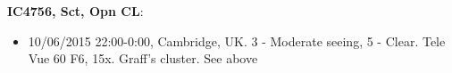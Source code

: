 {\bf IC4756, Sct, Opn CL}:
\begin{itemize}
\item 10/06/2015 22:00-0:00, Cambridge, UK. 3 - Moderate seeing, 5 - Clear. Tele Vue 60 F6, 15x. Graff's cluster. See above
\end{itemize}
